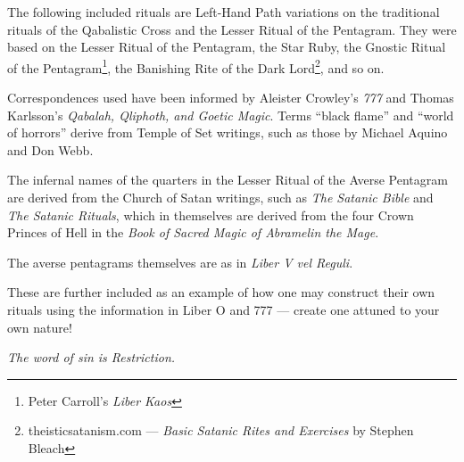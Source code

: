 \raggedbottom
{}

The following included rituals are Left-Hand Path variations on the traditional rituals of the Qabalistic Cross and the Lesser Ritual of the Pentagram. They were based on the Lesser Ritual of the Pentagram, the Star Ruby, the Gnostic Ritual of the Pentagram\footnote{Peter Carroll's \textit{Liber Kaos}}, the Banishing Rite of the Dark Lord\footnote{theisticsatanism.com --- \textit{Basic Satanic Rites and Exercises} by Stephen Bleach}, and so on.

Correspondences used have been informed by Aleister Crowley's \textit{777} and Thomas Karlsson's \textit{Qabalah, Qliphoth, and Goetic Magic}. Terms \enquote{black flame} and \enquote{world of horrors} derive from Temple of Set writings, such as those by Michael Aquino and Don Webb.

The infernal names of the quarters in the Lesser Ritual of the Averse Pentagram are derived from the Church of Satan writings, such as \textit{The Satanic Bible} and \textit{The Satanic Rituals}, which in themselves are derived from the four Crown Princes of Hell in the \textit{Book of Sacred Magic of Abramelin the Mage}.

The averse pentagrams themselves are as in \textit{Liber V vel Reguli}.

These are further included as an example of how one may construct their own rituals using the information in Liber O and 777 --- create one attuned to your own nature!

\textit{The word of sin is Restriction.}
